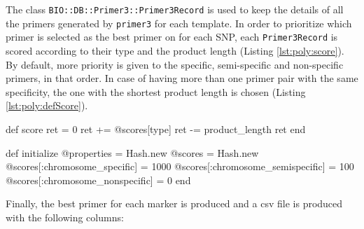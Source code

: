 The class \texttt{BIO::DB::Primer3::Primer3Record} is used to keep the details of all the primers generated by \verb|primer3| for each template. 
In order to prioritize which primer is selected as the best primer on for each SNP, each \verb|Primer3Record| is scored according to their type and the product length (Listing \ref{lst:poly:score}).
By default, more priority is given to the specific, semi-specific and non-specific primers, in that order. 
In case of having more than one primer pair with the same specificity, the one with the shortest product length is chosen (Listing \ref{lst:poly:defScore}).  


\begin{code}[language=Ruby,caption=Method that calculates the score of a primer \texttt{BIO::DB::Primer3::Primer3Record}, label=lst:poly:score]
def score
  ret = 0
  ret += @scores[type]
  ret -= product_length
  ret
end
\end{code}

\begin{code}[language=Ruby,caption=Initialization of the \texttt{BIO::DB::Primer3::Primer3Record} class\, including the default score weights, label=lst:poly:defScore]
def initialize
  @properties = Hash.new
  @scores = Hash.new
  @scores[:chromosome_specific] = 1000
  @scores[:chromosome_semispecific] = 100
  @scores[:chromosome_nonspecific] = 0
end
\end{code}

Finally, the best primer for each marker is produced and a \acrshort{csv} file is produced with the following columns: 

